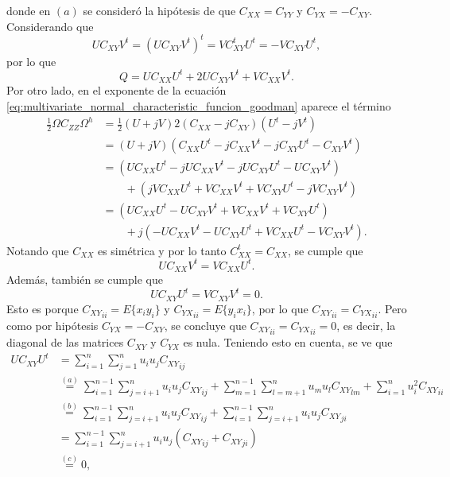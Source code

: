 \documentclass[a4paper]{report}
\begin{document}
donde en \((a)\) se consideró la hipótesis de que \(C_{XX}=C_{YY}\) y \(C_{YX}=-C_{XY}\). Considerando que
\begin{equation}\label{eq:goodman_theorem_deduction_tmp3}
 UC_{XY}V^t=(UC_{XY}V^t)^t=VC_{XY}^tU^t=-VC_{XY}U^t,
\end{equation}
por lo que
\begin{equation}\label{eq:goodman_theorem_deduction_tmp2}
 Q=UC_{XX}U^t+2UC_{XY}V^t+VC_{XX}V^t.
\end{equation}
Por otro lado, en el exponente de la ecuación \ref{eq:multivariate_normal_characteristic_funcion_goodman} aparece el término
\begin{align}\label{eq:goodman_theorem_deduction_tmp1}
 \frac{1}{2}\Omega C_{ZZ}\Omega^h&=\frac{1}{2}(U+jV)2(C_{XX}-jC_{XY})(U^t-jV^t)\nonumber\\
 &=(U+jV)(C_{XX}U^t-jC_{XX}V^t-jC_{XY}U^t-C_{XY}V^t)\nonumber\\
 &=(UC_{XX}U^t-jUC_{XX}V^t-jUC_{XY}U^t-UC_{XY}V^t)\nonumber\\
 &\qquad +(jVC_{XX}U^t+VC_{XX}V^t+VC_{XY}U^t-jVC_{XY}V^t)\nonumber\\
 &=(UC_{XX}U^t-UC_{XY}V^t+VC_{XX}V^t+VC_{XY}U^t)\nonumber\\
 &\qquad +j(-UC_{XX}V^t-UC_{XY}U^t+VC_{XX}U^t-VC_{XY}V^t).
\end{align}
Notando que \(C_{XX}\) es simétrica y por lo tanto \(C_{XX}^t=C_{XX}\), se cumple que
\[
 UC_{XX}V^t=VC_{XX}U^t.
\]
Además, también se cumple que
\[
 UC_{XY}U^t=VC_{XY}V^t=0.
\]
Esto es porque \({C_{XY}}_{ii}=E\{x_iy_i\}\) y \({C_{YX}}_{ii}=E\{y_ix_i\}\), por lo que \({C_{XY}}_{ii}={C_{YX}}_{ii}\). Pero como por hipótesis \(C_{YX}=-C_{XY}\), se concluye que \({C_{XY}}_{ii}={C_{YX}}_{ii}=0\), es decir, la diagonal de las matrices \(C_{XY}\) y \(C_{YX}\) es nula. Teniendo esto en cuenta, se ve que
\begin{align*}
 UC_{XY}U^t&=\sum_{i=1}^{n}\sum_{j=1}^{n}u_iu_j{C_{XY}}_{ij}\\
   &\overset{(a)}{=}\sum_{i=1}^{n-1}\sum_{j=i+1}^{n}u_iu_j{C_{XY}}_{ij}+\sum_{m=1}^{n-1}\sum_{l=m+1}^{n}u_mu_l{C_{XY}}_{lm}+\sum_{i=1}^nu_i^2{C_{XY}}_{ii}\\
   &\overset{(b)}{=}\sum_{i=1}^{n-1}\sum_{j=i+1}^{n}u_iu_j{C_{XY}}_{ij}+\sum_{i=1}^{n-1}\sum_{j=i+1}^{n}u_iu_j{C_{XY}}_{ji}\\
   &=\sum_{i=1}^{n-1}\sum_{j=i+1}^{n}u_iu_j\left({C_{XY}}_{ij}+{C_{XY}}_{ji}\right)\\
   &\overset{(c)}{=}0,
\end{align*}
\end{document}
